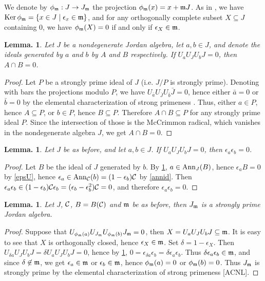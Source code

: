 \documentclass[a4paper,twoside,11pt]{article}
\theoremstyle{plain}
\theoremstyle{miestilo}
\newtheorem{lema}[subsection]{Lemma.}
\theoremstyle{misnotas}
\begin{document}
We denote by $\phi_{\frak m}:J\rightarrow J_{\frak m}$ the projection $\phi_{\frak m}(x) =
x+\frak mJ$. As in \cite[3.2.4]{bmami}, we have ${\rm Ker}\, \phi_{\frak m} = \{x \in J\mid \epsilon_x\in
\frak m\}$, and for any orthogonally complete subset  $X \subseteq J$ containing $0$, we have
$\phi_{\frak m}(X) = 0$ if and only if $\epsilon_X \in \frak m$.

\begin{lema}\label{spelemnt}Let $J$ be a nondegenerate Jordan algebra, let $a, b\in J$, and denote
the ideals generated by $a$ and $b$ by $A$ and $B$ respectively. If
$U_aU_JU_bJ= 0$, then $A\cap B = 0$.\end{lema}

\begin{proof} Let $P$ be a strongly prime ideal of $J$ (i.e. $J/P$ is strongly prime). Denoting
with bars the projections modulo $P$, we have $U_{\bar a}U_{\bar J}U_{\bar b}\bar J = 0$,
hence either $\bar a = 0$ or $\bar b=0$ by the elemental characterization of strong
primeness \cite{elemental1}. Thus, either $a \in P$, hence $A\subseteq P$, or $b \in P$, hence $B
\subseteq P$. Therefore $A\cap B \subseteq P$ for any strongly prime ideal $P$. Since the
intersection of those is the McCrimmon radical, which vanishes in the nondegenerate algebra
$J$, we get $A\cap B = 0$.\end{proof}

\begin{lema}\label{elemidemp}Let $J$ be as before, and let $a, b \in J$. If $U_aU_JU_bJ = 0$, then
$\epsilon_a\epsilon_b = 0$.\end{lema}

\begin{proof} Let $B$ be the ideal of $J$ generated by $b$. By \ref{spelemnt}, $a\in {\rm Ann}_J(B)$,
hence $\epsilon_aB = 0$ by \ref{epsU}, hence $\epsilon_a \in {\rm Ann}_\mathcal C(b) =
(1-\epsilon_b)\mathcal C$ by \ref{annid}. Then $\epsilon_a \epsilon_b \in (1-\epsilon_b)\mathcal C \epsilon_b=(\epsilon_b-\epsilon^2_{b})\mathcal C=0$, and therefore $\epsilon_a\epsilon_b= 0$.\end{proof}

\begin{lema}\label{spstalk}Let $J$, $\mathcal C$, $B= B(\mathcal C)$ and $\frak m$ be as before, then $J_{\frak m}$ is
a strongly prime Jordan algebra.\end{lema}

\begin{proof} Suppose that $U_{\phi_{\frak m}(a)}U_{J_{\frak m}}U_{\phi_{\frak m}(b)}J_{\frak m}= 0$,
then $X = U_aU_JU_bJ \subseteq \frak m$. It is easy to see that $X$ is orthogonally closed,
hence $\epsilon_X \in \frak m$. Set $\delta = 1-\epsilon_X$. Then $U_{\delta a}U_JU_bJ =
\delta U_aU_JU_bJ = 0$, hence by \ref{elemidemp}, $0 = \epsilon_{\delta a}\epsilon_b=
\delta\epsilon_a\epsilon_b$. Thus $\delta\epsilon_a\epsilon_b \in \frak m$, and since $\delta
\not\in \frak m$, we get $\epsilon_a\in \frak m$ or $\epsilon_b\in \frak m$, hence $\phi_{\frak
m}(a) = 0$ or $\phi_{\frak m}(b) = 0$. Thus $J_{\frak m}$ is strongly prime by the elemental
characterization of strong primeness [ACNL].\end{proof}
\end{document}
